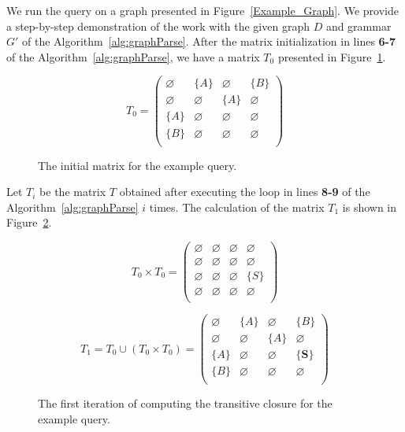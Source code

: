 We run the query on a graph presented in Figure~\ref{Example_Graph}. We provide a step-by-step demonstration of the work with the given graph $D$ and grammar $G'$ of the Algorithm~\ref{alg:graphParse}. After the matrix initialization in lines \textbf{6-7} of the Algorithm~\ref{alg:graphParse}, we have a matrix $T_0$ presented in Figure~\ref{ExampleQueryInitMatrix}.

\begin{figure}[h]
\[
T_0 = \begin{pmatrix}
    \varnothing & \{A\}       & \varnothing & \{B\}       \\
    \varnothing & \varnothing & \{A\}       & \varnothing \\
    \{A\}       & \varnothing & \varnothing & \varnothing \\
    \{B\}       & \varnothing & \varnothing & \varnothing \\
\end{pmatrix}
\]
\caption{The initial matrix for the example query.}
\label{ExampleQueryInitMatrix}
\end{figure}

Let $T_i$ be the matrix $T$ obtained after executing the loop in lines \textbf{8-9} of the Algorithm~\ref{alg:graphParse} $i$ times. The calculation of the matrix $T_1$ is shown in Figure~\ref{ExampleQueryFirstIteration}.

\begin{figure}[h]
\[
T_0 \times T_0 = \begin{pmatrix}
	\varnothing & \varnothing & \varnothing & \varnothing \\
	\varnothing & \varnothing & \varnothing & \varnothing \\
	\varnothing & \varnothing & \varnothing & \{S\}       \\
	\varnothing & \varnothing & \varnothing & \varnothing \\
\end{pmatrix}
\]

\[
T_1 = T_0 \cup (T_0 \times T_0) = \begin{pmatrix}
	\varnothing & \{A\}       & \varnothing & \{B\}       \\
	\varnothing & \varnothing & \{A\}       & \varnothing \\
	\{A\}       & \varnothing & \varnothing & \{\pmb{S}\}       \\
	\{B\}       & \varnothing & \varnothing & \varnothing \\
\end{pmatrix}
\]
\caption{The first iteration of computing the transitive closure for the example query.}
\label{ExampleQueryFirstIteration}
\end{figure}

